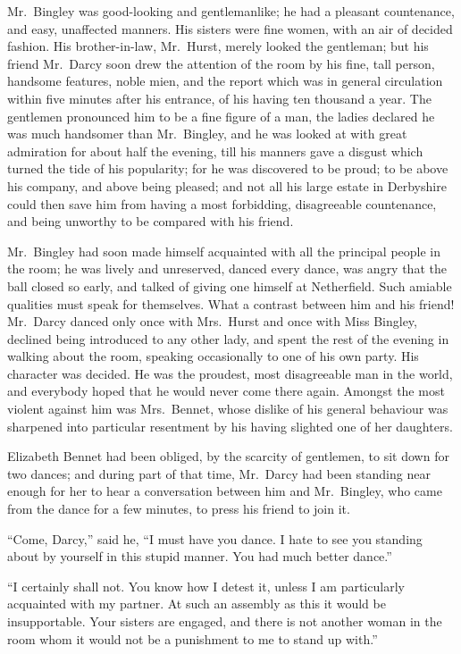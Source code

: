 \documentclass[12pt,english,oneside]{book}
\begin{document}
Mr.\ Bingley was good-looking and gentlemanlike; he had a pleasant
countenance, and easy, unaffected manners. His sisters were fine women,
with an air of decided fashion. His brother-in-law, Mr.\ Hurst, merely
looked the gentleman; but his friend Mr.\ Darcy soon drew the attention
of the room by his fine, tall person, handsome features, noble mien,
and the report which was in general circulation within five minutes
after his entrance, of his having ten thousand a year. The gentlemen
pronounced him to be a fine figure of a man, the ladies declared he
was much handsomer than Mr.\ Bingley, and he was looked at with great
admiration for about half the evening, till his manners gave a disgust
which turned the tide of his popularity; for he was discovered to
be proud; to be above his company, and above being pleased; and not
all his large estate in Derbyshire could then save him from having
a most forbidding, disagreeable countenance, and being unworthy to
be compared with his friend.

Mr.\ Bingley had soon made himself acquainted with all the principal
people in the room; he was lively and unreserved, danced every dance,
was angry that the ball closed so early, and talked of giving one
himself at Netherfield. Such amiable qualities must speak for themselves.
What a contrast between him and his friend! Mr.\ Darcy danced only
once with Mrs.\ Hurst and once with Miss Bingley, declined being
introduced to any other lady, and spent the rest of the evening in
walking about the room, speaking occasionally to one of his own party.
His character was decided. He was the proudest, most disagreeable
man in the world, and everybody hoped that he would never come there
again. Amongst the most violent against him was Mrs.\ Bennet, whose
dislike of his general behaviour was sharpened into particular resentment
by his having slighted one of her daughters.

Elizabeth Bennet had been obliged, by the scarcity of gentlemen, to
sit down for two dances; and during part of that time, Mr.\ Darcy
had been standing near enough for her to hear a conversation between
him and Mr.\ Bingley, who came from the dance for a few minutes,
to press his friend to join it.

{}``Come, Darcy,'' said he, {}``I must have you dance. I hate to
see you standing about by yourself in this stupid manner. You had
much better dance.''

{}``I certainly shall not. You know how I detest it, unless I am
particularly acquainted with my partner. At such an assembly as this
it would be insupportable. Your sisters are engaged, and there is
not another woman in the room whom it would not be a punishment to
me to stand up with.''
\end{document}
